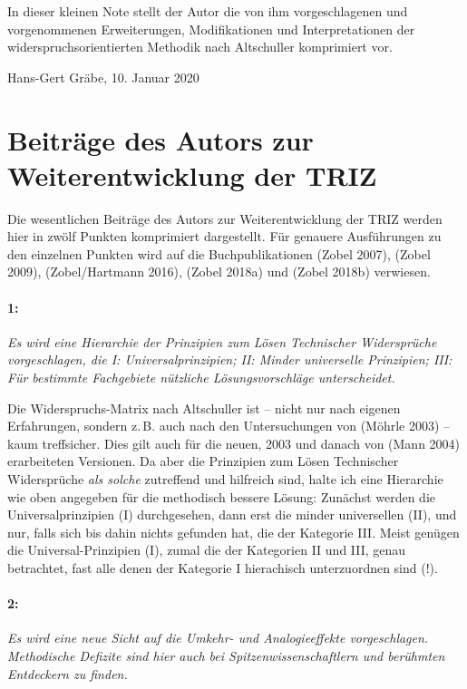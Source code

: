 \documentclass[12pt,a4paper]{article}
\newcommand{\these}[2]{\paragraph{#1:} \emph{#2}\par}
\begin{document}
In dieser kleinen Note stellt der Autor die von ihm vorgeschlagenen und
vorgenommenen Erweiterungen, Modifikationen und Interpretationen der
widerspruchsorientierten Methodik nach Altschuller komprimiert vor.

\begin{flushright}
  Hans-Gert Gräbe, 10. Januar 2020
\end{flushright}

\section*{Beiträge des Autors zur Weiterentwicklung der TRIZ}

Die wesentlichen Beiträge des Autors zur Weiterentwicklung der TRIZ werden
hier in zwölf Punkten komprimiert dargestellt.  Für genauere Ausführungen zu
den einzelnen Punkten wird auf die Buchpublikationen (Zobel 2007), (Zobel
2009), (Zobel/Hartmann 2016), (Zobel 2018a) und (Zobel 2018b) verwiesen.

\these{1}{Es wird eine Hierarchie der Prinzipien zum Lösen Technischer
  Widersprüche vorgeschlagen, die I: Universalprinzipien; II: Minder
  universelle Prinzipien; III: Für bestimmte Fachgebiete nützliche
  Lösungsvorschläge unterscheidet.}

Die Widerspruchs-Matrix nach Altschuller ist – nicht nur nach eigenen
Erfahrungen, sondern z.\,B. auch nach den Untersuchungen von (Möhrle 2003) –
kaum treffsicher. Dies gilt auch für die neuen, 2003 und danach von (Mann
2004) erarbeiteten Versionen. Da aber die Prinzipien zum Lösen Technischer
Widersprüche \emph{als solche} zutreffend und hilfreich sind, halte ich eine
Hierarchie wie oben angegeben für die methodisch bessere Lösung: Zunächst
werden die Universalprinzipien (I) durchgesehen, dann erst die minder
universellen (II), und nur, falls sich bis dahin nichts gefunden hat, die der
Kategorie III.  Meist genügen die Universal-Prinzipien (I), zumal die der
Kategorien II und III, genau betrachtet, fast alle denen der Kategorie I
hierachisch unterzuordnen sind (!).

\these{2}{Es wird eine neue Sicht auf die Umkehr- und Analogieeffekte
  vorgeschlagen. Methodische Defizite sind hier auch bei
  Spitzenwissenschaftlern und berühmten Entdeckern zu finden.}
\end{document}
